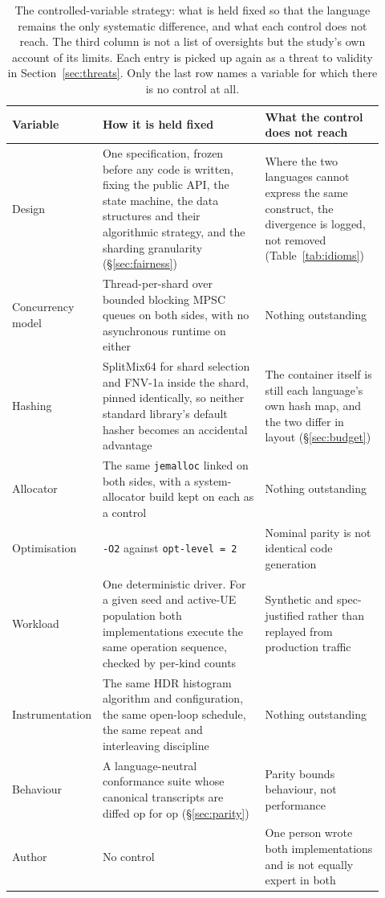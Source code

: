 \documentclass[english,twoside,openright,a4paper,censored,csm,software-track-2020]{HYthesisML}
\begin{document}
\begin{table}[H]
\centering
\small
\caption[The controlled-variable strategy]{The controlled-variable strategy: what is held fixed so that the language remains the
only systematic difference, and what each control does not reach. The third column is not a
list of oversights but the study's own account of its limits. Each entry is picked up again as
a threat to validity in Section~\ref{sec:threats}. Only the last row names a variable for
which there is no control at all.\label{tab:controls}}
\footnotesize
\renewcommand{\arraystretch}{1.15}
\begin{tabular}{@{}R{0.16\linewidth} R{0.44\linewidth} R{0.32\linewidth}@{}}
\hline\hline
Variable & How it is held fixed & What the control does not reach \\
\hline
Design & One specification, frozen before any code is written, fixing the public API, the state machine, the data structures and their algorithmic strategy, and the sharding granularity (\S\ref{sec:fairness}) & Where the two languages cannot express the same construct, the divergence is logged, not removed (Table~\ref{tab:idioms}) \\
Concurrency model & Thread-per-shard over bounded blocking MPSC queues on both sides, with no asynchronous runtime on either & Nothing outstanding \\
Hashing & SplitMix64 for shard selection and FNV-1a inside the shard, pinned identically, so neither standard library's default hasher becomes an accidental advantage & The container itself is still each language's own hash map, and the two differ in layout (\S\ref{sec:budget}) \\
Allocator & The same \texttt{jemalloc} linked on both sides, with a system-allocator build kept on each as a control & Nothing outstanding \\
Optimisation & \texttt{-O2} against \texttt{opt-level~=~2} & Nominal parity is not identical code generation \\
Workload & One deterministic driver. For a given seed and active-UE population both implementations execute the same operation sequence, checked by per-kind counts & Synthetic and spec-justified rather than replayed from production traffic \\
Instrumentation & The same HDR histogram algorithm and configuration, the same open-loop schedule, the same repeat and interleaving discipline & Nothing outstanding \\
Behaviour & A language-neutral conformance suite whose canonical transcripts are diffed op for op (\S\ref{sec:parity}) & Parity bounds behaviour, not performance \\
\hline
Author & No control & One person wrote both implementations and is not equally expert in both \\
\hline
\end{tabular}
\end{table}
\end{document}

